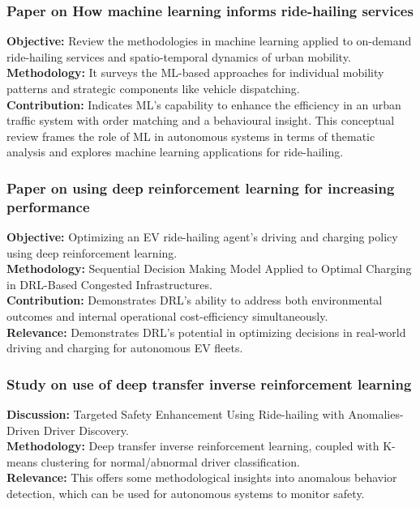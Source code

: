 \documentclass[lettersize,journal]{IEEEtran}
\begin{document}
\subsubsection{Paper on How machine learning informs ride-hailing services}\cite{ref42}
\textbf{Objective:} Review the methodologies in machine learning applied to on-demand ride-hailing services and spatio-temporal dynamics of urban mobility. \\
\textbf{Methodology:} It surveys the ML-based approaches for individual mobility patterns and strategic components like vehicle dispatching. \\
\textbf{Contribution:} Indicates ML's capability to enhance the efficiency in an urban traffic system with order matching and a behavioural insight. This conceptual review frames the role of ML in autonomous systems in terms of thematic analysis and explores machine learning applications for ride-hailing.

\subsubsection{Paper on using deep reinforcement learning for increasing performance}\cite{ref43}
\textbf{Objective:} Optimizing an EV ride-hailing agent's driving and charging policy using deep reinforcement learning. \\
\textbf{Methodology:} Sequential Decision Making Model Applied to Optimal Charging in DRL-Based Congested Infrastructures. \\
\textbf{Contribution:} Demonstrates DRL's ability to address both environmental outcomes and internal operational cost-efficiency simultaneously. \\
\textbf{Relevance:} Demonstrates DRL's potential in optimizing decisions in real-world driving and charging for autonomous EV fleets.

\subsubsection{Study on use of deep transfer inverse reinforcement learning}\cite{ref44}
\textbf{Discussion:} Targeted Safety Enhancement Using Ride-hailing with Anomalies-Driven Driver Discovery. \\
\textbf{Methodology:} Deep transfer inverse reinforcement learning, coupled with K-means clustering for normal/abnormal driver classification. \\
\textbf{Relevance:} This offers some methodological insights into anomalous behavior detection, which can be used for autonomous systems to monitor safety.
\end{document}
